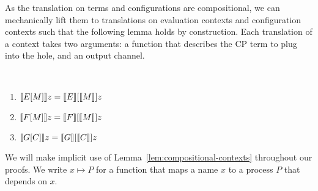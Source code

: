 \documentclass[oribibl,orivec,envcountsame]{llncs}
\begin{document}
As the translation on terms and configurations are compositional, we can mechanically lift them to
translations on evaluation contexts and configuration contexts such that the following lemma holds
by construction.
%
Each translation of a context takes two arguments: a function that describes the CP term to plug
into the hole, and an output channel.
%
%
\begin{lemma}
\label{lem:compositional-contexts}
~
\begin{enumerate}
\item $\llbracket E[M] \rrbracket z = \llbracket E \rrbracket[\llbracket M \rrbracket]z$
\item $\llbracket F[M] \rrbracket z = \llbracket F \rrbracket[\llbracket M \rrbracket]z$
\item $\llbracket G[C] \rrbracket z = \llbracket G \rrbracket[\llbracket C \rrbracket]z$
\end{enumerate}
\end{lemma}
%
We will make implicit use of Lemma~\ref{lem:compositional-contexts} throughout our proofs. We write
$x \mapsto P$ for a function that maps a name $x$ to a process $P$ that depends on $x$.

\end{document}
